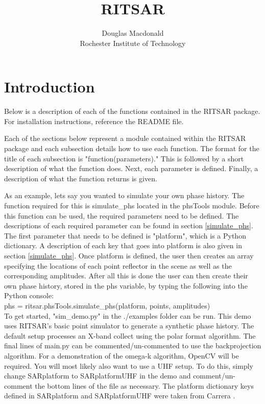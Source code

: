 \documentclass{article}
\title{RITSAR}
\author{Douglas Macdonald\\[2ex]
		Rochester Institute of Technology}
\begin{document}
\maketitle
\tableofcontents
\newpage

\section{Introduction}
Below is a description of each of the functions contained in the RITSAR package.  For installation instructions, reference the README file.  

Each of the sections below represent a module contained within the RITSAR package and each subsection details how to use each function.  The format for the title of each subsection is "function(parameters)."  This is followed by a short description of what the function does. Next, each parameter is defined.  Finally, a description of what the function returns is given.

As an example, lets say you wanted to simulate your own phase history.  The function required for this is simulate\_phs located in the phsTools module.  Before this function can be used, the required parameters need to be defined.  The descriptions of each required parameter can be found in section \ref{simulate_phs}.  The first parameter that needs to be defined is "platform", which is a Python dictionary. A description of each key that goes into platform is also given in section \ref{simulate_phs}.  Once platform is defined, the user then creates an array specifying the locations of each point reflector in the scene as well as the corresponding amplitudes.  After all this is done the user can then create their own phase history, stored in the phs variable, by typing the following into the Python console:\\[2ex]phs = ritsar.phsTools.simulate\_phs(platform, points, amplitudes)\\[2ex]  
To get started, "sim\_demo.py" in the ./examples folder can be run.  This demo uses RITSAR's basic point simulator to generate a synthetic phase history.  The default setup processes an X-band collect using the polar format algorithm.  The final lines of main.py can be commented/un-commented to use the backprojection algorithm.  For a demonstration of the omega-k algorithm, OpenCV will be required.  You will most likely also want to use a UHF setup.  To do this, simply change SARplatform to SARplatformUHF in the demo and comment/un-comment the bottom lines of the file as necessary.  The platform dictionary keys defined in SARplatform and SARplatformUHF were taken from Carrera \cite{Carrera}.
\end{document}
